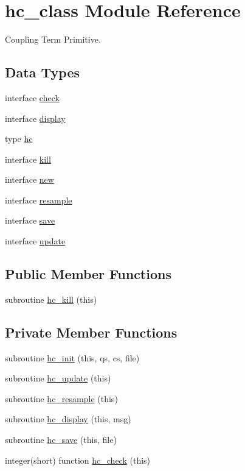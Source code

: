 \hypertarget{classhc__class}{\section{hc\+\_\+class Module Reference}
\label{classhc__class}
}


Coupling Term Primitive.  


\subsection*{Data Types}
\begin{DoxyCompactItemize}
\item 
interface \hyperlink{interfacehc__class_1_1check}{check}
\item 
interface \hyperlink{interfacehc__class_1_1display}{display}
\item 
type \hyperlink{structhc__class_1_1hc}{hc}
\item 
interface \hyperlink{interfacehc__class_1_1kill}{kill}
\item 
interface \hyperlink{interfacehc__class_1_1new}{new}
\item 
interface \hyperlink{interfacehc__class_1_1resample}{resample}
\item 
interface \hyperlink{interfacehc__class_1_1save}{save}
\item 
interface \hyperlink{interfacehc__class_1_1update}{update}
\end{DoxyCompactItemize}
\subsection*{Public Member Functions}
\begin{DoxyCompactItemize}
\item 
subroutine \hyperlink{classhc__class_a72759d56fe1bbe360bfe0efaae62b6a6}{hc\+\_\+kill} (this)
\end{DoxyCompactItemize}
\subsection*{Private Member Functions}
\begin{DoxyCompactItemize}
\item 
subroutine \hyperlink{classhc__class_a6a95655090afaac2c5f7b049c3919597}{hc\+\_\+init} (this, qs, cs, file)
\item 
subroutine \hyperlink{classhc__class_a5b4008b35ac8a501909a4b9aed8fcd71}{hc\+\_\+update} (this)
\item 
subroutine \hyperlink{classhc__class_a1b4a0d9a46c63f538c74670dca5fdc82}{hc\+\_\+resample} (this)
\item 
subroutine \hyperlink{classhc__class_a484af233bb8b65db73534ae297fa7346}{hc\+\_\+display} (this, msg)
\item 
subroutine \hyperlink{classhc__class_ac1fbe6abcc3415c55bd2b920cbb47234}{hc\+\_\+save} (this, file)
\item 
integer(short) function \hyperlink{classhc__class_ad0b55c92720ef59cfd8b4cecd194afe1}{hc\+\_\+check} (this)
\end{DoxyCompactItemize}


